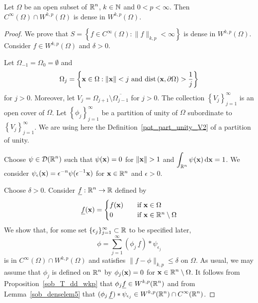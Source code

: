 \begin{theorem} \label{sob_Cinfty_dense}
Let $\Omega$ be an open subset of $\displaystyle \mathbb{R}^n$, $k\in \mathbb{N}$
and $0<p<\infty$.
Then $\displaystyle C^\infty(\Omega) \cap W^{k,p}(\Omega)$ is dense in
$\displaystyle W^{k,p}(\Omega)$.
\end{theorem}

\begin{proof}
We prove that
$\displaystyle
S = \left\{ f \in C^\infty(\Omega) :  \|f\|_{k,p} < \infty \right\}$
is dense in $\displaystyle W^{k,p}(\Omega)$.  Consider
$\displaystyle f\in W^{k,p}(\Omega)$ and $\delta>0$.

 Let $\displaystyle \Omega_{-1} = \Omega_0 = \emptyset$ and
\[
\Omega_j = \left\{ \VEC{x} \in \Omega : \|\VEC{x}\| < j \ \text{and} \ 
\dist{\VEC{x}}{\partial \Omega} > \frac{1}{j} \right\}
\]
for $j>0$.  Moreover, let
$\displaystyle V_j = \Omega_{j+1} \setminus \overline{\Omega_{j-1}}$
for $j>0$.
The collection $\displaystyle \left\{ V_j \right\}_{j=1}^\infty$ is an
open cover of $\Omega$.  Let
$\displaystyle \left\{ \phi_j \right\}_{j=1}^\infty$ be a partition
of unity of $\Omega$ subordinate to
$\displaystyle \left\{ V_j \right\}_{j=1}^\infty$.  We are using here
the Definition~\ref{pot_part_unity_V2} of a partition of unity.

Choose $\displaystyle \psi \in \mathcal{D}(\mathbb{R}^n)$ such that
$\psi(\mathbf{x}) = 0$ for $\|\VEC{x}\|>1$ and
$\displaystyle \int_{\mathbb{R}^n} \psi(\mathbf{x}) \,\mathrm{d}{\mathbf{x}} = 1$.
We consider
$\displaystyle \psi_\epsilon(\mathbf{x}) = \epsilon^{-n}
\psi(\epsilon^{-1} \mathbf{x})$ for $\mathbf{x} \in \mathbb{R}^n$ and $\epsilon>0$.

 Choose $\delta >0$.  Consider
$\displaystyle \underline{f}: \mathbb{R}^n \to \mathbb{R}$ defined by
\[
\underline{f}(\mathbf{x}) =
\begin{cases}
f(\mathbf{x}) & \quad \text{if} \ \mathbf{x} \in \Omega \\
0 & \quad \text{if} \ \mathbf{x} \in \mathbb{R}^n \setminus \Omega
\end{cases}
\]
We show that, for some set
$\displaystyle \{\epsilon_j\}_{j=1}^\infty \subset \mathbb{R}$ to be
specified later,
\begin{equation} \label{sob_HequalsW_phi}
\phi = \sum_{j=1}^\infty (\phi_j\,\underline{f}) \ast \psi_{\epsilon_j}
\end{equation}
is in $\displaystyle C^\infty(\Omega) \cap W^{k,p}(\Omega)$ and satisfies
$\|f-\phi\|_{k,p} \leq \delta$ on $\Omega$.  As usual, we may assume
that $\phi_j$ is defined on $\displaystyle \mathbb{R}^n$ by $\phi_j(\mathbf{x}) = 0$ for
$\displaystyle \mathbf{x} \in \mathbb{R}^n\setminus \Omega$.
It follows from Proposition~\ref{sob_T_dd_wkp} that
$\displaystyle \phi_j \underline{f} \in W^{k,p}(\mathbb{R}^n)$ and from
Lemma~\ref{sob_denselem5} that
$\displaystyle (\phi_j\,\underline{f}) \ast \psi_{\epsilon_j} \in
W^{k,p}(\mathbb{R}^n) \cap C^\infty(\mathbb{R}^n)$.


\end{proof}
